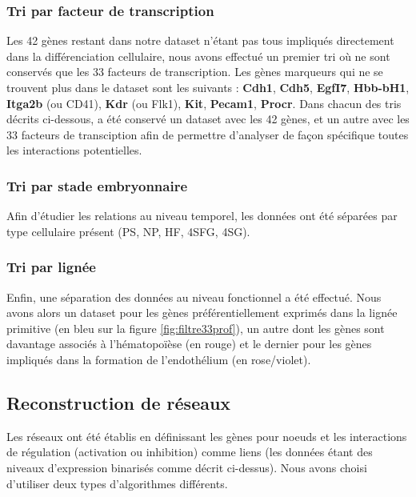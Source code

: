 \documentclass[fleqn,11pt]{SelfArx} %
\begin{document}
\subsubsection{Tri par facteur de transcription}
Les 42 gènes restant dans notre dataset n'étant pas tous impliqués directement dans la différenciation cellulaire, nous avons effectué un premier tri où ne sont conservés que les 33 facteurs de transcription. Les gènes marqueurs qui ne se trouvent plus dans le dataset sont les suivants : \textbf{Cdh1}, \textbf{Cdh5}, \textbf{EgfI7}, \textbf{Hbb-bH1}, \textbf{Itga2b} (ou CD41), \textbf{Kdr} (ou Flk1), \textbf{Kit}, \textbf{Pecam1}, \textbf{Procr}. Dans chacun des tris décrits ci-dessous, a été conservé un dataset avec les 42 gènes, et un autre avec les 33 facteurs de transciption afin de permettre d'analyser de façon spécifique toutes les interactions potentielles.
\subsubsection{Tri par stade embryonnaire}
Afin d'étudier les relations au niveau temporel, les données ont été séparées par type cellulaire présent (PS, NP, HF, 4SFG, 4SG). 
\subsubsection{Tri par lignée}
Enfin, une séparation des données au niveau fonctionnel a été effectué. Nous avons alors un dataset pour les gènes préférentiellement exprimés dans la lignée primitive (en bleu sur la figure \ref{fig:filtre33prof}), un autre dont les gènes sont davantage associés à l'hématopoïèse (en rouge) et le dernier pour les gènes impliqués dans la formation de l'endothélium (en rose/violet).

\subsection{Reconstruction de réseaux}
Les réseaux ont été établis en définissant les gènes pour noeuds et les interactions de régulation (activation ou inhibition) comme liens (les données étant des niveaux d'expression binarisés comme décrit ci-dessus). Nous avons choisi d'utiliser deux types d'algorithmes différents.
\end{document}
